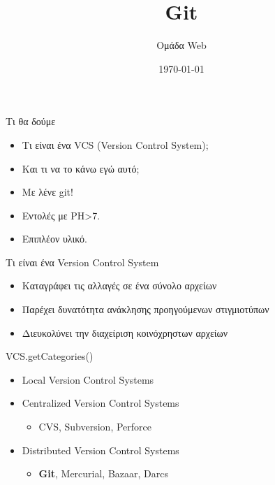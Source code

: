 \documentclass{beamer}
\title{Git}
\author{
Ομάδα Web}
\date{\today}
\begin{document}
\begin{frame}
\begin{minipage}{\hsize}
\centering
\end{minipage}
\titlepage
\end{frame}

\begin{frame}{Τι θα δούμε}
  \begin{itemize}
   \item Τι είναι ένα VCS (Version Control System);
   \pause
   \item Και τι να το κάνω εγώ αυτό;
   \pause
   \item Με λένε git!
   \pause
   \item Εντολές με PH>7.
   \pause
   \item Επιπλέον υλικό.
  \end{itemize}
\end{frame}

\begin{frame}{Τι είναι ένα Version Control System}
  \begin{itemize}
    \item Καταγράφει τις αλλαγές σε ένα σύνολο αρχείων
    \item Παρέχει δυνατότητα ανάκλησης προηγούμενων στιγμιοτύπων
    \item Διευκολύνει την διαχείριση κοινόχρηστων αρχείων
  \end{itemize}
\end{frame}

\begin{frame}{VCS.getCategories()}
  \begin{itemize}
    \item Local Version Control Systems
    \item Centralized Version Control Systems
    \begin{itemize}
      \item CVS, Subversion, Perforce
    \end{itemize}
    \item Distributed Version Control Systems
    \begin{itemize}
      \item \textbf{Git}, Mercurial, Bazaar, Darcs
    \end{itemize}
  \end{itemize}
\end{frame}
\end{document}
